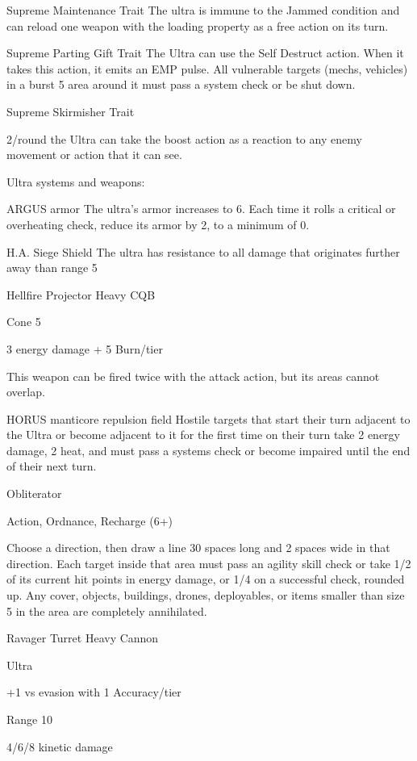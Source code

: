 Supreme Maintenance
Trait
The ultra is immune to the Jammed condition and can reload one weapon with the loading
property as a free action on its turn.


Supreme Parting Gift
Trait
The Ultra can use the Self Destruct action. When it takes this action, it emits an EMP pulse. All
vulnerable targets (mechs, vehicles) in a burst 5 area around it must pass a system check or be
shut down.


Supreme Skirmisher
Trait

2/round the Ultra can take the boost action as a reaction to any enemy movement or action that
it can see.


Ultra systems and weapons:

ARGUS armor
The ultra's armor increases to 6. Each time it rolls a critical or overheating check, reduce its
armor by 2, to a minimum of 0.


H.A. Siege Shield
The ultra has resistance to all damage that originates further away than range 5


Hellfire Projector
Heavy CQB

Cone 5

3 energy damage + 5 Burn/tier

This weapon can be fired twice with the attack action, but its areas cannot overlap.





HORUS manticore repulsion field
Hostile targets that start their turn adjacent to the Ultra or become adjacent to it for the first time
on their turn take 2 energy damage, 2 heat, and must pass a systems check or become impaired
until the end of their next turn.


Obliterator

Action, Ordnance, Recharge (6+)

Choose a direction, then draw a line 30 spaces long and 2 spaces wide in that direction. Each
target inside that area must pass an agility skill check or take 1/2 of its current hit points in energy
damage, or 1/4 on a successful check, rounded up. Any cover, objects, buildings, drones,
deployables, or items smaller than size 5 in the area are completely annihilated.


Ravager Turret
Heavy Cannon

Ultra

+1 vs evasion with 1 Accuracy/tier

Range 10

4/6/8 kinetic damage

